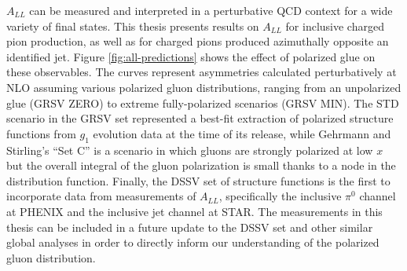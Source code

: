 \(A_{LL}\) can be measured and interpreted in a perturbative QCD context for a wide variety of final states. This thesis presents results on \(A_{LL}\) for inclusive charged pion production, as well as for charged pions produced azimuthally opposite an identified jet.  Figure \ref{fig:all-predictions} shows the effect of polarized glue on these observables.  The curves represent asymmetries calculated perturbatively at NLO assuming various polarized gluon distributions, ranging from an unpolarized glue (GRSV ZERO) to extreme fully-polarized scenarios (GRSV MIN).  The STD scenario in the GRSV \cite{Gluck:2000dy} set represented a best-fit extraction of polarized structure functions from \(g_1\) evolution data at the time of its release, while Gehrmann and Stirling's ``Set C'' \cite{Gehrmann:1995ag} is a scenario in which gluons are strongly polarized at low \(x\) but the overall integral of the gluon polarization is small thanks to a node in the distribution function.  Finally, the DSSV \cite{deFlorian:2008mr} set of structure functions is the first to incorporate data from measurements of \(A_{LL}\), specifically the inclusive \(\pi^0\) channel at PHENIX and the inclusive jet channel at STAR.  The measurements in this thesis can be included in a future update to the DSSV set and other similar global analyses in order to directly inform our understanding of the polarized gluon distribution.


